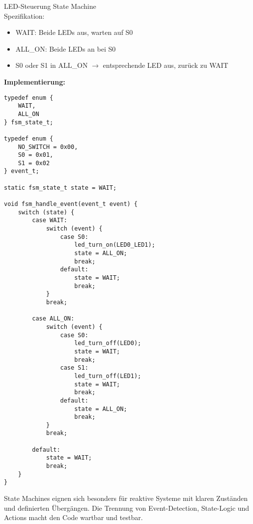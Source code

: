 \begin{example2}{LED-Steuerung State Machine}\\
    Spezifikation:
    \begin{itemize}
        \item WAIT: Beide LEDs aus, warten auf S0
        \item ALL\_ON: Beide LEDs an bei S0
        \item S0 oder S1 in ALL\_ON $\rightarrow$ entsprechende LED aus, zurück zu WAIT
    \end{itemize}
    
    \tcblower
    
    \textbf{Implementierung:}
\begin{lstlisting}[style=basesmol]
typedef enum {
    WAIT,
    ALL_ON
} fsm_state_t;

typedef enum {
    NO_SWITCH = 0x00,
    S0 = 0x01,
    S1 = 0x02
} event_t;

static fsm_state_t state = WAIT;

void fsm_handle_event(event_t event) {
    switch (state) {
        case WAIT:
            switch (event) {
                case S0:
                    led_turn_on(LED0_LED1);
                    state = ALL_ON;
                    break;
                default:
                    state = WAIT;
                    break;
            }
            break;
            
        case ALL_ON:
            switch (event) {
                case S0:
                    led_turn_off(LED0);
                    state = WAIT;
                    break;
                case S1:
                    led_turn_off(LED1);
                    state = WAIT;
                    break;
                default:
                    state = ALL_ON;
                    break;
            }
            break;
            
        default:
            state = WAIT;
            break;
    }
}
\end{lstlisting}
\end{example2}

\begin{remark}
    State Machines eignen sich besonders für reaktive Systeme mit klaren Zuständen und definierten Übergängen. Die Trennung von Event-Detection, State-Logic und Actions macht den Code wartbar und testbar.
\end{remark}
